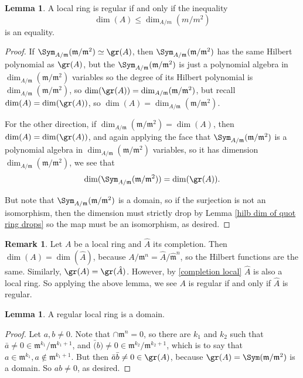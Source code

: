 \documentclass[12 pt]{article}
\theoremstyle{definition}
\newtheorem{lemma}[thm]{Lemma}
\newtheorem{rmk}[thm]{Remark}
\renewcommand{\(}{\left(}
\renewcommand{\)}{\right)}
\newcommand\fm{{\mathfrak m}}
\begin{document}
\begin{lemma} A local ring is regular if and only if the inequality
\[\dim(A) \leq \dim_{A/m}(m/m^2)\]
is an equality.
\end{lemma}
\begin{proof}
If $\Sym_{A/\fm}(\fm/\fm^2) \simeq \gr(A)$, then $\Sym_{A/\fm}(\fm/\fm^2)$ has the same Hilbert polynomial as $\gr(A)$, but the $\Sym_{A/\fm}(\fm/\fm^2)$ is just a polynomial algebra in $\dim_{A/\fm}(\fm/\fm^2)$ variables so the degree of its Hilbert polynomial is $\dim_{A/\fm}(\fm/\fm^2)$, so $\dim(\gr(A))=\dim_{A/\fm}(\fm/\fm^2)$, but recall $\dim(A)=\dim(\gr(A))$, so $\dim(A)=\dim_{A/\fm}(\fm/\fm^2)$.

For the other direction, if $\dim_{A/\fm}(\fm/\fm^2)=\dim(A)$, then $\dim(A)=\dim(\gr(A))$, and again applying the face that $ \Sym_{A/\fm}(\fm/\fm^2)$ is a polynomial algebra in $\dim_{A/\fm}(\fm/\fm^2)$ variables, so it has dimension $\dim_{A/\fm}(\fm/\fm^2)$, we see that
\[\dim(\Sym_{A/\fm}(\fm/\fm^2))=\dim(\gr(A)).\]

But note that $\Sym_{A/\fm}(\fm/\fm^2)$ is a domain, so if the surjection is not an isomorphism, then the dimension must strictly drop by Lemma \ref{hilb dim of quot ring drops} so the map must be an isomorphism, as desired.
\end{proof}

\begin{rmk} Let $A$ be a local ring and $\hat{A}$ its completion. Then $\dim(A)=\dim(\hat{A})$, because $A/\fm^n=\hat{A}/\hat{\fm}^n$, so the Hilbert functions are the same. Similarly, $\gr(A)=\gr(\hat{A})$. However, by \ref{completion local} $\hat{A}$ is also a local ring. So applying the above lemma, we see  $A$ is regular if and only if $\hat{A}$ is regular.
\end{rmk}


\begin{lemma} A regular local ring is a domain.
\label{reg loc means domain}
\end{lemma}
\begin{proof} Let $a,b \neq 0$. Note that $\cap \fm^n=0$, so there are $k_1$ and $k_2$ such that $\bar{a} \neq 0 \in \fm^{k_1}/\fm^{k_1+1}$, and $\bar(b) \neq 0 \in \fm^{k_2}/\fm^{k_2+1}$, which is to say that $a \in \fm^{k_1}, a \not \in \fm^{k_1+1}$. But then $\bar{a}\bar{b} \neq 0 \in \gr(A)$, because $\gr(A)=\Sym(\fm/\fm^2)$ is a domain. So $ab \neq 0$, as desired.
\end{proof}
\end{document}
